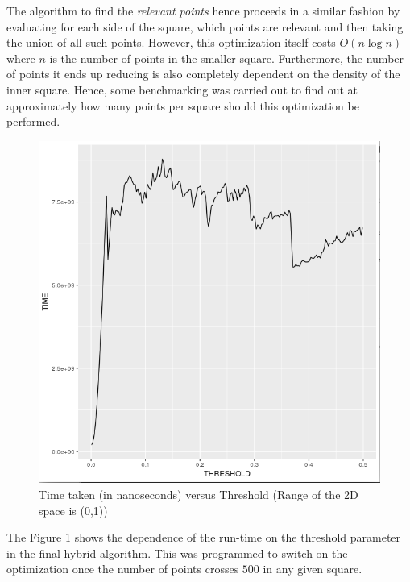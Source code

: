 The algorithm to find the \emph{relevant points} hence proceeds in a similar fashion by evaluating for each side of the square, which points are relevant and then taking the union of all such points.
However, this optimization itself costs $O(n\log{n})$ where $n$ is the number of points in the smaller square. Furthermore, the number of points it ends up reducing is also completely dependent on the density of the inner square. Hence, some benchmarking was carried out to find out at approximately how many points per square should this optimization be performed.
\begin{figure}%
    \includegraphics[scale=0.7]{Pictures/optimization_benchmark.png}
    \caption[Optimization]{Time taken (in nanoseconds) versus Threshold (Range of the 2D space is (0,1))}
	\label{fig:opt-bench}
\end{figure}


The Figure \ref{fig:opt-bench} shows the dependence of the run-time on the threshold parameter in the final hybrid algorithm. This was programmed to switch on the optimization once the number of points crosses $500$ in any given square.
